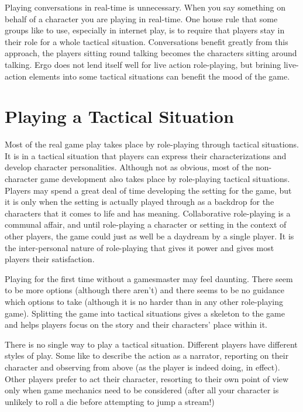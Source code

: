 \documentclass[twoside]{book}
\begin{document}
Playing conversations in real-time is unnecessary. When you say
something on behalf of a character you are playing in real-time. One
house rule that some groups like to use, especially in internet play,
is to require that players stay in their role for a whole tactical
situation. Conversations benefit greatly from this approach, the
players sitting round talking becomes the characters sitting around
talking. Ergo does not lend itself well for live action role-playing,
but brining live-action elements into some tactical situations can
benefit the mood of the game.

\section{Playing a Tactical Situation}

Most of the real game play takes place by role-playing through
tactical situations. It is in a tactical situation that players can
express their characterizations and develop character
personalities. Although not as obvious, most of the non-character game
development also takes place by role-playing tactical
situations. Players may spend a great deal of time developing the
setting for the game, but it is only when the setting is actually
played through as a backdrop for the characters that it comes to life
and has meaning. Collaborative role-playing is a communal affair, and
until role-playing a character or setting in the context of other
players, the game could just as well be a daydream by a single
player. It is the inter-personal nature of role-playing that gives it
power and gives most players their satisfaction.

Playing for the first time without a gamesmaster may feel
daunting. There seem to be more options (although there aren't) and
there seems to be no guidance which options to take (although it is no
harder than in any other role-playing game). Splitting the game into
tactical situations gives a skeleton to the game and helps players
focus on the story and their characters' place within it.

There is no single way to play a tactical situation. Different players
have different styles of play. Some like to describe the action as a
narrator, reporting on their character and observing from above (as
the player is indeed doing, in effect). Other players prefer to act
their character, resorting to their own point of view only when game
mechanics need to be considered (after all your character is unlikely
to roll a die before attempting to jump a stream!)
\end{document}
